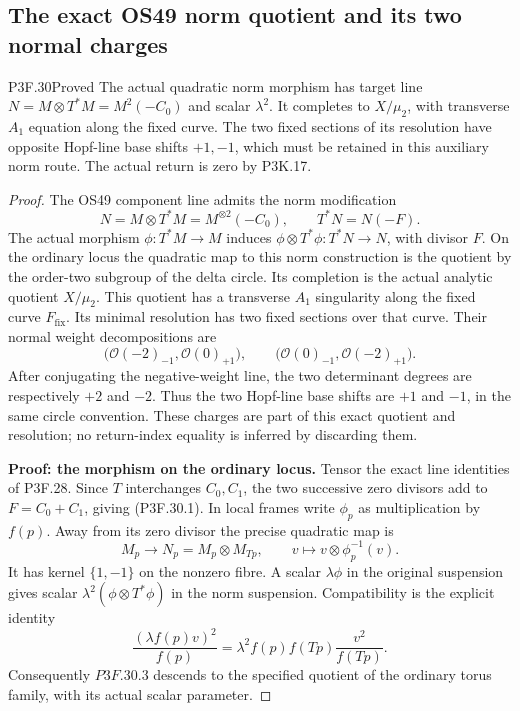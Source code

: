 \subsection{The exact OS49 norm quotient and its two normal charges}
\begin{statement}{P3F.30}{Proved}
The actual quadratic norm morphism has target line $N=M\otimes T^*M=M^2(-C_0)$ and scalar $\lambda^2$. It completes to $X/\mu_2$, with transverse $A_1$ equation along the fixed curve. The two fixed sections of its resolution have opposite Hopf-line base shifts $+1,-1$, which must be retained in this auxiliary norm route. The actual return is zero by P3K.17.
\end{statement}
\begin{proof}
The OS49 component line admits the norm modification \[
 N=M\otimes T^*M=M^{\otimes2}(-C_0),
 \qquad T^*N=N(-F).                                  \tag{P3F.30.1}
\] The actual morphism \(\phi:T^*M\to M\) induces \(\phi\otimes T^*\phi:T^*N\to N\), with divisor \(F\). On the ordinary locus the quadratic map to this norm construction is the quotient by the order-two subgroup of the delta circle. Its completion is the actual analytic quotient \(X/\mu_2\). This quotient has a transverse \(A_1\) singularity along the fixed curve \(F_{\mathrm{fix}}\). Its minimal resolution has two fixed sections over that curve. Their normal weight decompositions are \[
 \bigl(\mathcal O(-2)_{-1},\mathcal O(0)_{+1}\bigr),
 \qquad
 \bigl(\mathcal O(0)_{-1},\mathcal O(-2)_{+1}\bigr).
                                                               \tag{P3F.30.2}
\] After conjugating the negative-weight line, the two determinant degrees are respectively \(+2\) and \(-2\). Thus the two Hopf-line base shifts are \(+1\) and \(-1\), in the same circle convention. These charges are part of this exact quotient and resolution; no return-index equality is inferred by discarding them.

\textbf{Proof: the morphism on the ordinary locus.} Tensor the exact line identities of P3F.28. Since \(T\) interchanges \(C_0,C_1\), the two successive zero divisors add to \(F=C_0+C_1\), giving (P3F.30.1). In local frames write \(\phi_p\) as multiplication by \(f(p)\). Away from its zero divisor the precise quadratic map is \[
 M_p\longrightarrow N_p=M_p\otimes M_{Tp},
 \qquad v\longmapsto v\otimes\phi_p^{-1}(v).
                                                               \tag{P3F.30.3}
\] It has kernel \(\{1,-1\}\) on the nonzero fibre. A scalar \(\lambda\phi\) in the original suspension gives scalar \(\lambda^2(\phi\otimes T^*\phi)\) in the norm suspension. Compatibility is the explicit identity \[
 \frac{(\lambda f(p)v)^2}{f(p)}
 =\lambda^2 f(p)f(Tp)\frac{v^2}{f(Tp)}.
\] Consequently \(P3F.30.3\) descends to the specified quotient of the ordinary torus family, with its actual scalar parameter.


\end{proof}
